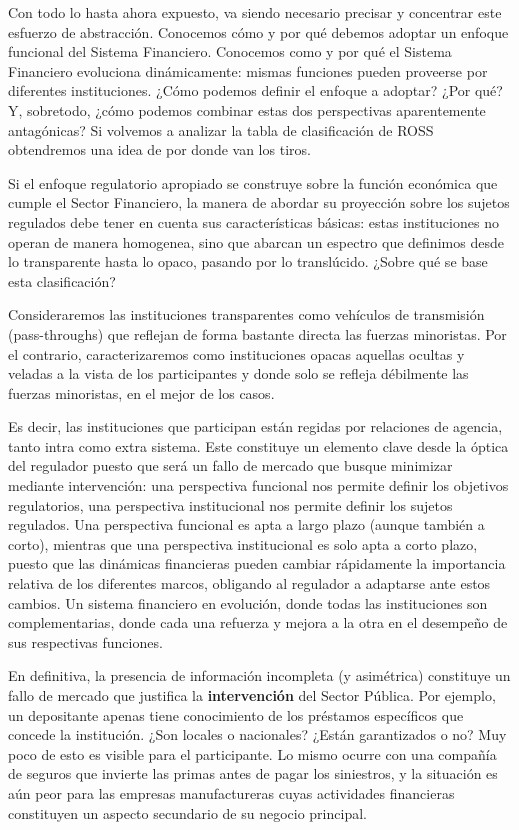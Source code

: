 \documentclass[10pt,a4paper]{article}
\begin{document}
Con todo lo hasta ahora expuesto, va siendo necesario precisar y concentrar este esfuerzo de abstracción. Conocemos cómo y por qué debemos adoptar un enfoque funcional del Sistema Financiero. Conocemos como y por qué el Sistema Financiero evoluciona dinámicamente: mismas funciones pueden proveerse por diferentes instituciones. ¿Cómo podemos definir el enfoque a adoptar? ¿Por qué? Y, sobretodo, ¿cómo podemos combinar estas dos perspectivas aparentemente antagónicas? Si volvemos a analizar la tabla de clasificación de ROSS obtendremos una idea de por donde van los tiros.

Si el enfoque regulatorio apropiado se construye sobre la función económica que cumple el Sector Financiero, la manera de abordar su proyección sobre los sujetos regulados debe tener en cuenta sus características básicas: estas instituciones no operan de manera homogenea, sino que abarcan un espectro que definimos desde lo transparente hasta lo opaco, pasando por lo translúcido. ¿Sobre qué se base esta clasificación? 

Consideraremos las instituciones transparentes como vehículos de transmisión (pass-throughs) que reflejan de forma bastante directa las fuerzas minoristas. Por el contrario, caracterizaremos como instituciones opacas aquellas ocultas y veladas a la vista de los participantes y donde solo se refleja débilmente las fuerzas minoristas, en el mejor de los casos. 

Es decir, las instituciones que participan están regidas por relaciones de agencia, tanto intra como extra sistema. Este constituye un elemento clave desde la óptica del regulador puesto que será un fallo de mercado que busque minimizar mediante intervención: una perspectiva funcional nos permite definir los objetivos regulatorios, una perspectiva institucional nos permite definir los sujetos regulados. Una perspectiva funcional es apta a largo plazo (aunque también a corto), mientras que una perspectiva institucional es solo apta a corto plazo, puesto que las dinámicas financieras pueden cambiar rápidamente la importancia relativa de los diferentes marcos, obligando al regulador a adaptarse ante estos cambios. Un sistema financiero en evolución, donde todas las instituciones son complementarias, donde cada una refuerza y mejora a la otra en el desempeño de sus respectivas funciones.

En definitiva, la presencia de información incompleta (y asimétrica) constituye un fallo de mercado que justifica la \textbf{intervención} del Sector Pública. Por ejemplo, un depositante apenas tiene conocimiento de los préstamos específicos que concede la institución. ¿Son locales o nacionales? ¿Están garantizados o no? Muy poco de esto es visible para el participante. Lo mismo ocurre con una compañía de seguros que invierte las primas antes de pagar los siniestros, y la situación es aún peor para las empresas manufactureras cuyas actividades financieras constituyen un aspecto secundario de su negocio principal.
\end{document}
